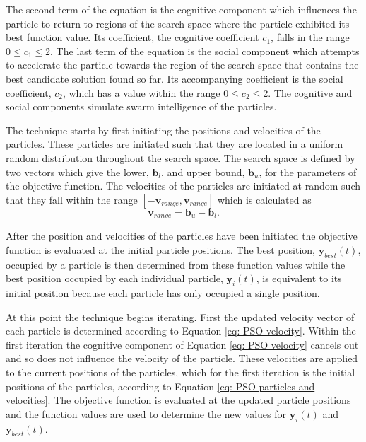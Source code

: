\documentclass[12pt,oneside,openany,a4paper, %
english, %
masters-t, goldenblock]{usthesis}
\begin{document}
The second term of the equation is the cognitive component which influences the particle to return to regions of the search space where the particle exhibited its best function value. Its coefficient, the cognitive coefficient $c_1$, falls in the range $0\leq c_1 \leq 2$. The last term of the equation is the social component which attempts to accelerate the particle towards the region of the search space that contains the best candidate solution found so far. Its accompanying coefficient is the social coefficient, $c_2$, which has a value within the range $0\leq c_2 \leq 2$. The cognitive and social components simulate swarm intelligence of the particles.

The technique starts by first initiating the positions and velocities of the particles. These particles are initiated such that they are located in a uniform random distribution throughout the search space. The search space is defined by two vectors which give the lower, $\bm{b}_l$, and upper bound, $\bm{b}_u$, for the parameters of the objective function. The velocities of the particles are initiated at random such that they fall within the range $[-\bm{v}_{range},\bm{v}_{range}]$ which is calculated as
\begin{equation}
  \bm{v}_{range} = \bm{b}_u - \bm{b}_l.
\end{equation}

After the position and velocities of the particles have been initiated the objective function is evaluated at the initial particle positions. The best position, $\bm{y}_{best}(t)$, occupied by a particle is then determined from these function values while the best position occupied by each individual particle, $\bm{y}_i(t)$, is equivalent to its initial position because each particle has only occupied a single position. 

At this point the technique begins iterating. First the updated velocity vector of each particle is determined according to Equation \ref{eq: PSO velocity}. Within the first iteration the cognitive component of Equation \ref{eq: PSO velocity} cancels out and so does not influence the velocity of the particle. These velocities are applied to the current positions of the particles, which for the first iteration is the initial positions of the particles, according to Equation \ref{eq: PSO particles and velocities}. The objective function is evaluated at the updated particle positions and the function values are used to determine the new values for $\bm{y}_i(t)$ and $\bm{y}_{best}(t)$.
\end{document}
